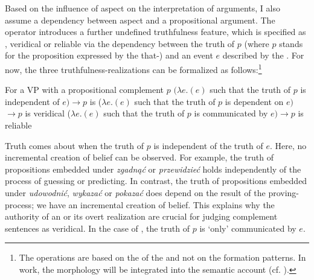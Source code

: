 \documentclass[output=paper,  modfonts,  newtxmath,  hidelinks		  ]{langscibook}
\begin{document}
Based on the influence of aspect on the interpretation of  arguments, I also assume a dependency between aspect and a propositional argument. The  operator  introduces a further undefined truthfulness feature, which is specified as , veridical or reliable via the dependency between the truth of $p$ (where $p$ stands for the proposition expressed by the that-) and an event $e$ described by the . For now, the three truthfulness-realizations can be formalized as follows:\footnote{The operations are based on the  of the  and not on the formation patterns. In  work, the morphology will be integrated into the semantic account (cf. \citealt{Młynarczyk2004}).}

\newpage 
\ea For a VP with a propositional complement $p$
\ea {}\hspace{1pt}$(\lambda e.$$(e)$ such that the truth of $p$ is independent of $e)$\newline$\rightarrow p$ is 
\ex {}\hspace{1pt}($\lambda e.$$(e)$ such that the truth of $p$ is dependent on $e)$\newline$\rightarrow p$ is veridical
\ex {}\hspace{1pt}($\lambda e.$$(e)$ such that the truth of $p$ is communicated by $e)$\newline$\rightarrow p$ is reliable
\z
\z



\noindent Truth  comes about when the truth of $p$ is independent of the truth of $e$. Here, no incremental creation of belief can be observed. For example, the truth of propositions embedded under \textit{zgadnąć} or \textit{przewidzieć} holds independently of the process of guessing or predicting. In contrast, the truth of propositions embedded under \textit{udowodnić}, \textit{wykazać} or \textit{pokazać} does depend on the result of the proving-process; we have an incremental creation of belief. This explains why the authority of an  or its overt realization are crucial for judging complement sentences as veridical. In the case of , the truth of $p$ is ‘only’ communicated by $e$.
\end{document}
